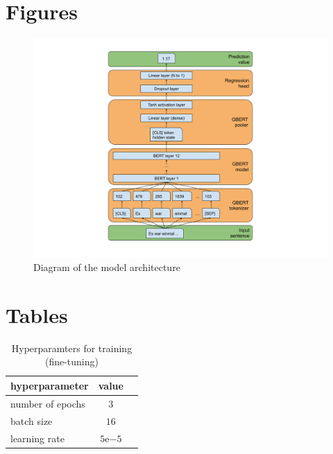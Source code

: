 \documentclass[11pt, DIV12]{scrartcl}
\begin{document}
\newpage


\newpage
\begin{appendices}

\section{Figures}
\label{appendix:figures}

\begin{figure}[h]
\includegraphics[width=\linewidth]{bert_regressor.png}
\caption{Diagram of the model architecture}
\label{fig:diag_model}
\end{figure}


\section{Tables}
\label{appendix:tables}

\begin{table}[h]
\center
  \begin{tabular}{l|cc}
    hyperparameter & value & \\
    \hline
    number of epochs & \(3\) & \\
    batch size & \(16\) & \\
    learning rate & \(5\mathrm{e}{-5}\) & \\
  \end{tabular}
  \caption{Hyperparamters for training (fine-tuning)}
  \label{tab:train_hyperparams}
\end{table}

\end{appendices}
\end{document}
